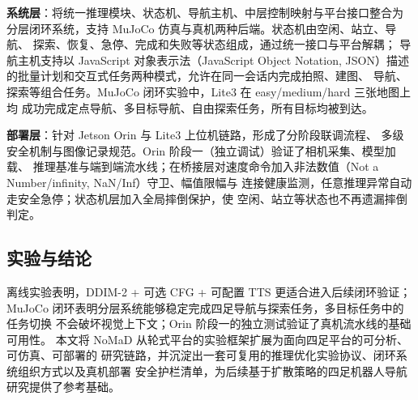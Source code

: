 \begin{digest}[zh]
\textbf{系统层}：将统一推理模块、状态机、导航主机、中层控制映射与平台接口整合为
分层闭环系统，支持 MuJoCo 仿真与真机两种后端。状态机由空闲、站立、导航、
探索、恢复、急停、完成和失败等状态组成，通过统一接口与平台解耦；
导航主机支持以 JavaScript 对象表示法（JavaScript Object Notation, JSON）描述的批量计划和交互式任务两种模式，允许在同一会话内完成拍照、建图、
导航、探索等组合任务。MuJoCo 闭环实验中，Lite3 在 easy/medium/hard 三张地图上均
成功完成定点导航、多目标导航、自由探索任务，所有目标均被到达。

\textbf{部署层}：针对 Jetson Orin 与 Lite3 上位机链路，形成了分阶段联调流程、
多级安全机制与图像记录规范。Orin 阶段一（独立调试）验证了相机采集、模型加载、
推理基准与端到端流水线；在桥接层对速度命令加入非法数值（Not a Number/infinity, NaN/Inf）守卫、幅值限幅与
连接健康监测，任意推理异常自动走安全急停；状态机层加入全局摔倒保护，使
空闲、站立等状态也不再遗漏摔倒判定。

\subsection*{实验与结论}

离线实验表明，DDIM-2 + 可选 CFG + 可配置 TTS 更适合进入后续闭环验证；
MuJoCo 闭环表明分层系统能够稳定完成四足导航与探索任务，多目标任务中的任务切换
不会破坏视觉上下文；Orin 阶段一的独立测试验证了真机流水线的基础可用性。
本文将 NoMaD 从轮式平台的实验框架扩展为面向四足平台的可分析、可仿真、可部署的
研究链路，并沉淀出一套可复用的推理优化实验协议、闭环系统组织方式以及真机部署
安全护栏清单，为后续基于扩散策略的四足机器人导航研究提供了参考基础。

\end{digest}
\fi

